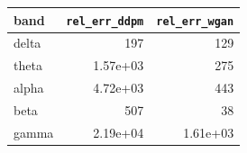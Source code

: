 \begin{tabular}{lrr}
\toprule
band & \texttt{rel\_err\_ddpm} & \texttt{rel\_err\_wgan} \\
\midrule
delta & 197 & 129 \\
theta & 1.57e+03 & 275 \\
alpha & 4.72e+03 & 443 \\
beta & 507 & 38 \\
gamma & 2.19e+04 & 1.61e+03 \\
\bottomrule
\end{tabular}
